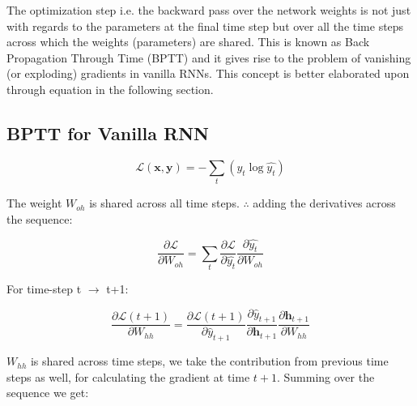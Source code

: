 The optimization step i.e. the backward pass over the network weights is not just with regards to the parameters at the final time step but over all the time steps across which the weights (parameters) are shared. This is known as Back Propagation Through Time (BPTT) \citep{Werbos1990} and it gives rise to the problem of vanishing (or exploding) gradients in vanilla RNNs. This concept is better elaborated upon through equation in the following section.

\subsection{BPTT for Vanilla RNN}
\begin{equation}
\mathbf{\mathcal{L}\left(x,y\right)} = - \sum_{t}\left(y_t \log\hat{y_t}\right)
\end{equation}

The weight $W_{oh}$ is shared across all time steps. $\therefore$ adding the derivatives across the sequence:

\begin{equation}
\frac{\partial \mathbf{\mathcal{L}}}{\partial W_{oh}} = \sum_{t}\frac{\partial \mathbf{\mathcal{L}}}{\partial \hat{y_t}} \frac{\partial  \hat{y_t}}{\partial W_{oh}}
\end{equation}

For time-step t $\rightarrow$ t+1:

\begin{equation}
\frac{\partial \mathbf{\mathcal{L}}\left(t+1\right)}{\partial W_{hh}} = \frac{\partial \mathbf{\mathcal{L}}\left(t+1\right)}{\partial \hat{y}_{t+1}} \frac{\partial  \hat{y}_{t+1}}{\partial \mathbf{h}_{t+1}} \frac{\partial \mathbf{h}_{t+1}}{\partial W_{hh}}
\end{equation}

$W_{hh}$ is shared across time steps, we take the contribution from previous time steps as well, for calculating the gradient at time $t+1$. Summing over the sequence we get:


